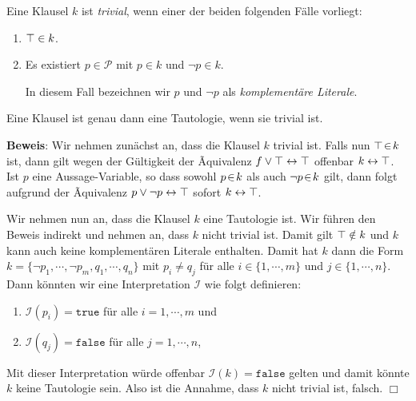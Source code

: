 \begin{Definition}
  Eine Klausel $k$ ist \emph{trivial}, wenn einer der beiden folgenden F\"{a}lle vorliegt:
  \begin{enumerate}
  \item $\top \in k$.
  \item Es existiert $p \in \mathcal{P}$ mit $p \in k$ und $\neg p \in k$.

        In diesem Fall bezeichnen wir $p$ und $\neg p$ als \emph{komplement\"{a}re Literale}.
        \eox
\end{enumerate}
\end{Definition}

\begin{Satz} \label{satz:trivial}
  Eine Klausel ist genau dann eine Tautologie, wenn sie trivial ist.
\end{Satz}
\textbf{Beweis}:  Wir nehmen zun\"{a}chst an, dass die Klausel $k$ trivial ist.
Falls nun $\top \!\in\! k$ ist, dann gilt wegen der G\"{u}ltigkeit der Ãquivalenz 
$f \vee \top \leftrightarrow \top$
offenbar $k \leftrightarrow \top$.   Ist $p$ eine Aussage-Variable, so dass
sowohl $p \!\in\! k$ als auch $\neg p \!\in\! k$ gilt, dann folgt aufgrund der Ãquivalenz $p \vee
\neg p \leftrightarrow \top$ sofort $k \leftrightarrow \top$.

Wir nehmen nun an, dass die Klausel $k$ eine Tautologie ist.  Wir f\"{u}hren den Beweis
indirekt und nehmen an, dass $k$ nicht trivial ist.  Damit gilt  $\top \notin k$ und
$k$ kann auch keine komplement\"{a}ren Literale enthalten.  Damit hat $k$ dann die Form
\\[0.2cm]
\hspace*{1.3cm} 
$k = \{ \neg p_1, \cdots, \neg p_m, q_1, \cdots, q_n \}$ \quad mit $p_i
\not= q_j$ f\"{u}r alle $i \in \{ 1,\cdots,m\}$ und $j \in \{1, \cdots, n\}$.
\\[0.2cm]
Dann k\"{o}nnten wir eine Interpretation $\mathcal{I}$ wie folgt definieren:
\begin{enumerate}
\item $\mathcal{I}(p_i) = \mathtt{true}$ f\"{u}r alle $i = 1, \cdots, m$ und
\item $\mathcal{I}(q_j) = \mathtt{false}$ f\"{u}r alle $j = 1, \cdots, n$,
\end{enumerate}
Mit dieser Interpretation w\"{u}rde offenbar $\mathcal{I}(k) = \mathtt{false}$ gelten und damit k\"{o}nnte $k$ keine
Tautologie sein.  Also ist die Annahme, dass $k$ nicht trivial ist, falsch.
\hspace*{\fill}  $\Box$

